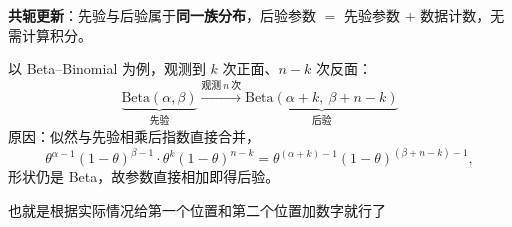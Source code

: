 \begin{note}
\textbf{共轭更新}：先验与后验属于\textbf{同一族分布}，后验参数 $=$ 先验参数 $+$ 数据计数，无需计算积分。

以 Beta--Binomial 为例，观测到 $k$ 次正面、$n-k$ 次反面：
\[
\underbrace{\mathrm{Beta}(\alpha,\beta)}_{\text{先验}}
\xrightarrow{\text{观测}\ n\ \text{次}}
\underbrace{\mathrm{Beta}(\alpha+k,\ \beta+n-k)}_{\text{后验}}
\]
原因：似然与先验相乘后指数直接合并，
\[
\theta^{\alpha-1}(1-\theta)^{\beta-1}\cdot\theta^{k}(1-\theta)^{n-k}
=\theta^{(\alpha+k)-1}(1-\theta)^{(\beta+n-k)-1},
\]
形状仍是 Beta，故参数直接相加即得后验。
\end{note}
\begin{dxtips}
    也就是根据实际情况给第一个位置和第二个位置加数字就行了
\end{dxtips}

